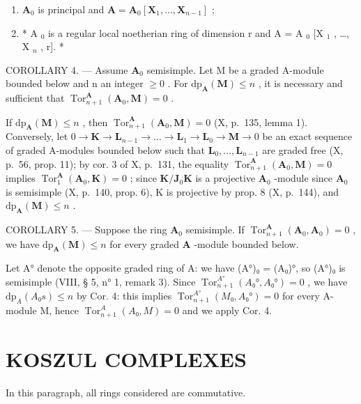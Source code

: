 \begin{enumerate}
\def\labelenumi{\alph{enumi})}
\item
  \(\mathbf{A}_0\) is principal and \(\mathbf{A} = \mathbf{A}_0[\mathbf{X}_1, \dots, \mathbf{X}_{n-1}]\) ;
\item
  * A \(_{0}\) is a regular local noetherian ring of dimension r and A = A \(_{0}\) {[}X \(_{1}\) , \ldots, X \(_{n}\) , r{]}. *
\end{enumerate}

COROLLARY 4. --- Assume \(\mathbf{A}_{0}\) semisimple. Let M be a graded A-module bounded below and n an integer \(\geqslant 0\) . For \(\mathrm{dp}_{\mathbf{A}}(\mathbf{M}) \leqslant n\) , it is necessary and sufficient that \(\operatorname{Tor}_{n+1}^{\mathbf{A}}(\mathbf{A}_{0}, \mathbf{M}) = 0\) .

If \(\mathrm{dp}_{\mathbf{A}}(\mathbf{M}) \leqslant n\) , then \(\operatorname{Tor}_{n+1}^{\mathbf{A}}(\mathbf{A}_0, \mathbf{M}) = 0\) (X, p.~135, lemma 1). Conversely, let \(0 \to \mathbf{K} \to \mathbf{L}_{n-1} \to \ldots \to \mathbf{L}_1 \to \mathbf{L}_0 \to \mathbf{M} \to 0\) be an exact sequence of graded A-modules bounded below such that \(\mathbf{L}_0, \ldots, \mathbf{L}_{n-1}\) are graded free (X, p.~56, prop. 11); by cor. 3 of X, p.~131, the equality \(\operatorname{Tor}_{n+1}^{\mathbf{A}}(\mathbf{A}_0, \mathbf{M}) = 0\) implies \(\operatorname{Tor}_1^{\mathbf{A}}(\mathbf{A}_0, \mathbf{K}) = 0\) ; since \(\mathbf{K} / \mathbf{J}_0\mathbf{K}\) is a projective \(\mathbf{A}_0\) -module since \(\mathbf{A}_0\) is semisimple (X, p.~140, prop. 6), K is projective by prop. 8 (X, p.~144), and \(\mathrm{dp}_{\mathbf{A}}(\mathbf{M}) \leqslant n\) .

COROLLARY 5. --- Suppose the ring \(\mathbf{A}_0\) semisimple. If \(\operatorname{Tor}_{n+1}^{\mathbf{A}}(\mathbf{A}_0, \mathbf{A}_0) = 0\) , we have \(\mathrm{dp}_{\mathbf{A}}(\mathbf{M}) \leqslant n\) for every graded \(\mathbf{A}\) -module bounded below.

Let A° denote the opposite graded ring of A: we have (A°)₀ = (A₀)°, so (A°)₀ is semisimple (VIII, § 5, n° 1, remark 3). Since \(\operatorname{Tor}_{n+1}^{A°}(A₀°, A₀°) = 0\) , we have \(\mathrm{dp}_A(A₀s) \leqslant n\) by Cor. 4: this implies \(\operatorname{Tor}_{n+1}^{A°}(M₀, A₀°) = 0\) for every A-module M, hence \(\operatorname{Tor}_{n+1}^{A}(A₀, M) = 0\) and we apply Cor. 4.

\section{KOSZUL COMPLEXES}

In this paragraph, all rings considered are commutative.
